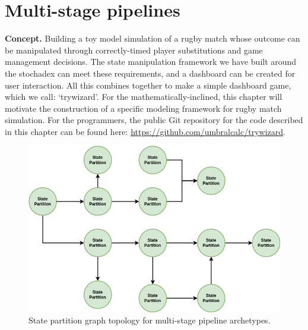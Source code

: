 \chapter{\sffamily Multi-stage pipelines}

{\bfseries\sffamily Concept.} Building a toy model simulation of a rugby match whose outcome can be manipulated through correctly-timed player substitutions and game management decisions. The state manipulation framework we have built around the stochadex can meet these requirements, and a dashboard can be created for user interaction. All this combines together to make a simple dashboard game, which we call: `trywizard'. For the mathematically-inclined, this chapter will motivate the construction of a specific modeling framework for rugby match simulation. For the programmers, the public Git repository for the code described in this chapter can be found here: \href{https://github.com/umbralcalc/trywizard}{https://github.com/umbralcalc/trywizard}.

\begin{figure}[h]
\centering
\includegraphics[width=12cm]{images/chapter-9-state-partition-graph.drawio.png}
\caption{State partition graph topology for multi-stage pipeline archetypes.}
\label{fig:state-partition-graph-multi-stage-pipelines}
\end{figure}
